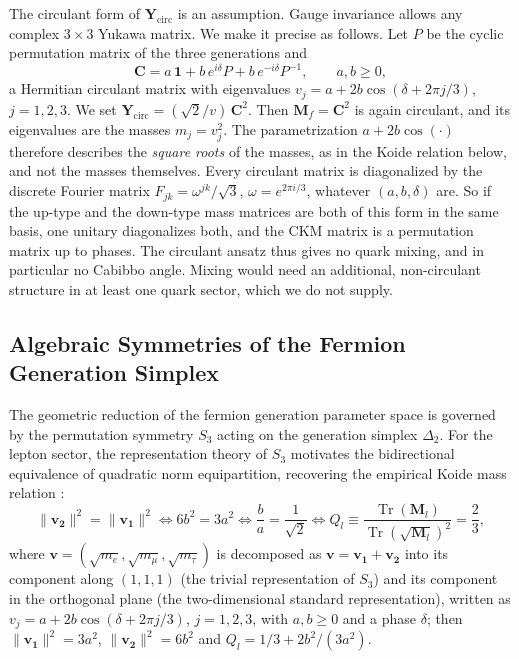 \documentclass[11pt,a4paper,reqno]{amsart}
\theoremstyle{definition}
\numberwithin{equation}{section}
\newcommand{\Tr}{\operatorname{Tr}}
\begin{document}
The circulant form of $\mathbf{Y}_{\mathrm{circ}}$ is an assumption. Gauge invariance allows any complex $3 \times 3$ Yukawa matrix. We make it precise as follows. Let $P$ be the cyclic permutation matrix of the three generations and
\begin{equation}
    \label{eq:circulant_root}
    \mathbf{C} = a\,\mathbf{1} + b\,e^{i\delta} P + b\,e^{-i\delta} P^{-1}, \qquad a, b \ge 0,
\end{equation}
a Hermitian circulant matrix with eigenvalues $v_j = a + 2b\cos(\delta + 2\pi j/3)$, $j = 1,2,3$. We set $\mathbf{Y}_{\mathrm{circ}} = (\sqrt2/v)\,\mathbf{C}^2$. Then $\mathbf{M}_f = \mathbf{C}^2$ is again circulant, and its eigenvalues are the masses $m_j = v_j^2$. The parametrization $a + 2b\cos(\cdot)$ therefore describes the \emph{square roots} of the masses, as in the Koide relation below, and not the masses themselves. Every circulant matrix is diagonalized by the discrete Fourier matrix $F_{jk} = \omega^{jk}/\sqrt3$, $\omega = e^{2\pi i/3}$, whatever $(a, b, \delta)$ are. So if the up-type and the down-type mass matrices are both of this form in the same basis, one unitary diagonalizes both, and the CKM matrix is a permutation matrix up to phases. The circulant ansatz thus gives no quark mixing, and in particular no Cabibbo angle. Mixing would need an additional, non-circulant structure in at least one quark sector, which we do not supply.
\subsection{Algebraic Symmetries of the Fermion Generation Simplex}
The geometric reduction of the fermion generation parameter space is governed by the permutation symmetry $S_3$ acting on the generation simplex $\Delta_2$. For the lepton sector, the representation theory of $S_3$ motivates the bidirectional equivalence of quadratic norm equipartition, recovering the empirical Koide mass relation \cite{koide1981}:
\begin{equation}
    \|\mathbf{v}_{\mathbf{2}}\|^2 = \|\mathbf{v}_{\mathbf{1}}\|^2 \iff 6b^2 = 3a^2 \iff \frac{b}{a} = \frac{1}{\sqrt{2}} \iff Q_l \equiv \frac{\Tr(\mathbf{M}_l)}{\Tr(\sqrt{\mathbf{M}_l})^2} = \frac{2}{3},
\end{equation}
where $\mathbf{v} = (\sqrt{m_e}, \sqrt{m_\mu}, \sqrt{m_\tau})$ is decomposed as $\mathbf{v} = \mathbf{v}_{\mathbf{1}} + \mathbf{v}_{\mathbf{2}}$ into its component along $(1,1,1)$ (the trivial representation of $S_3$) and its component in the orthogonal plane (the two-dimensional standard representation), written as $v_j = a + 2b\cos(\delta + 2\pi j/3)$, $j = 1,2,3$, with $a, b \ge 0$ and a phase $\delta$; then $\|\mathbf{v}_{\mathbf{1}}\|^2 = 3a^2$, $\|\mathbf{v}_{\mathbf{2}}\|^2 = 6b^2$ and $Q_l = 1/3 + 2b^2/(3a^2)$.
\end{document}
